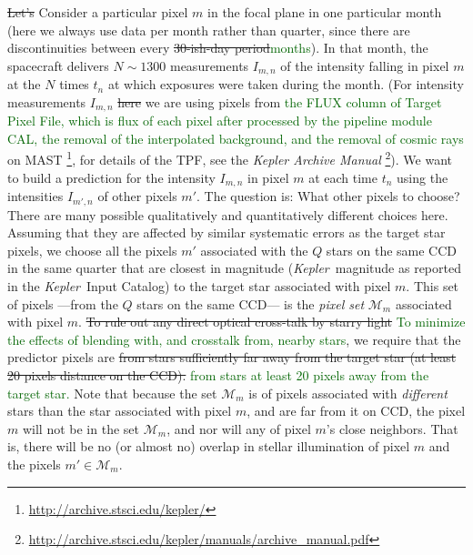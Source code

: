 \documentclass[12pt, preprint]{aastex}
\newcommand{\project}[1]{\textsl{#1}}
\newcommand{\Kepler}{\project{Kepler}}
\newcommand{\set}[1]{\mathcal{#1}}
\newcommand{\revise}[1]{\textcolor{darkgreen}{#1}}
\newcommand{\remove}[1]{\sout{#1}}
\begin{document}
\remove{Let's} Consider a particular pixel $m$ in the focal plane in one particular month
  (here we always use data per month rather than quarter,  since there are discontinuities between every \remove{30-ish-day period}\revise{months}).
In that month, the spacecraft delivers $N\sim 1300$ measurements $I_{m,n}$
  of the intensity falling in pixel $m$ at the $N$ times $t_n$ at which exposures were taken during the month.
(For intensity measurements $I_{m,n}$ \remove{here} we are using pixels from \revise{the FLUX column of Target Pixel File, which is flux of each pixel after processed by the pipeline module CAL, the removal of the interpolated background, and the removal of cosmic rays} on MAST
  \footnote{\url{http://archive.stsci.edu/kepler/}}, for details of the TPF, 
  see the \project{Kepler Archive Manual} 
  \footnote{\url{http://archive.stsci.edu/kepler/manuals/archive_manual.pdf}}).
We want to build a prediction for the intensity $I_{m,n}$ in pixel $m$ at each time $t_n$
  using the intensities $I_{m',n}$ of other pixels $m'$.
The question is:  What other pixels to choose?
There are many possible qualitatively and quantitatively different choices here.
Assuming that they are affected by similar systematic errors as the target star pixels, 
  we choose all the pixels $m'$ associated with the $Q$ stars on the same CCD in the same quarter that are closest in magnitude
  (\Kepler\ magnitude as reported in the \Kepler\ Input Catalog)
  to the target star associated with pixel $m$.
This set of pixels%
  ---from the $Q$ stars on the same CCD---%
  is the \emph{pixel set} $\set{M}_m$ associated with pixel $m$.
  \remove{To rule out any direct optical cross-talk by starry light}
  \revise{To minimize the effects of blending with, and crosstalk from, nearby stars}, we require that the predictor pixels are \remove{from stars
sufficiently far away from the target star (at least 20 pixels distance on the CCD).}
\revise{from stars at least 20 pixels away from the target star.}
Note that because the set $\set{M}_m$ is of pixels associated with \emph{different} stars
  than the star associated with pixel $m$, and are far from it on CCD, 
  the pixel $m$ will not be in the set $\set{M}_m$,
  and nor will any of pixel $m$'s close neighbors.
That is, there will be no (or almost no) overlap in stellar illumination of pixel $m$
  and the pixels $m'\in\set{M}_m$.
\end{document}
